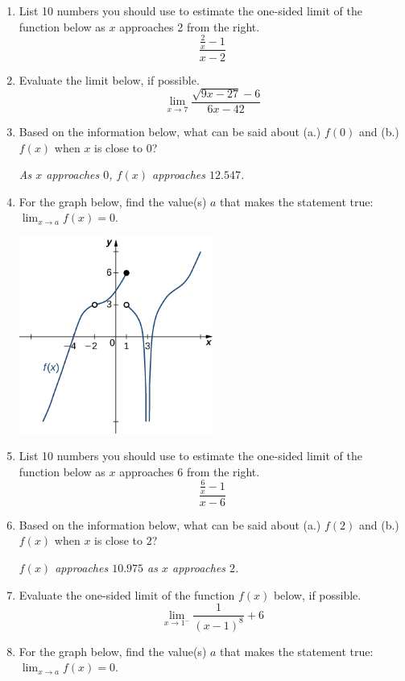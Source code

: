 \documentclass[14pt]{extbook}
\begin{document}
\begin{enumerate}
\item{
List 10 numbers you should use to estimate the one-sided limit of the function below as $x$ approaches 2 from the right.\[ \frac{\frac{2}{x} - 1}{x - 2} \]} \newpage
\item{
Evaluate the limit below, if possible.\[ \lim_{x \rightarrow 7} \frac{\sqrt{9x - 27} - 6}{6x - 42} \]} \newpage
\item{
Based on the information below, what can be said about (a.) $f(0)$ and (b.) $f(x)$ when $x$ is close to $0$?
\begin{center}
    \textit{ As $x$ approaches $0$, $f(x)$ approaches $12.547$. }
\end{center}
} \newpage
\item{
For the graph below, find the value(s) $a$ that makes the statement true: $ \displaystyle \lim_{x \rightarrow a} f(x) = 0$.
\begin{center}
    \includegraphics[width=0.5\textwidth]{../Figures/evaluateLimitGraphicallyA.png}
\end{center}
} \newpage
\item{
List 10 numbers you should use to estimate the one-sided limit of the function below as $x$ approaches 6 from the right.\[ \frac{\frac{6}{x} - 1}{x - 6} \]} \newpage
\item{
Based on the information below, what can be said about (a.) $f(2)$ and (b.) $f(x)$ when $x$ is close to $2$?
\begin{center}
    \textit{ $f(x)$ approaches $10.975$ as $x$ approaches $2$. }
\end{center}
} \newpage
\item{
Evaluate the one-sided limit of the function $f(x)$ below, if possible.\[ \lim_{x \rightarrow 1^-} \frac{1}{(x-1)^8}+6 \]} \newpage
\item{
For the graph below, find the value(s) $a$ that makes the statement true: $ \displaystyle \lim_{x \rightarrow a} f(x) = 0$.
}
\end{enumerate}
\end{document}
